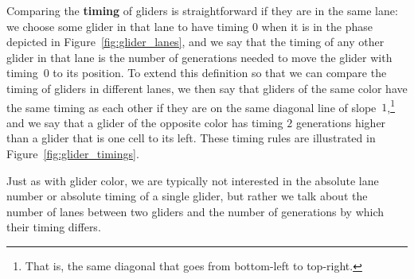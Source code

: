 Comparing the \textbf{timing} of gliders is straightforward if they are in the same lane: we choose some glider in that lane to have timing $0$ when it is in the phase depicted in Figure~\ref{fig:glider_lanes}, and we say that the timing of any other glider in that lane is the number of generations needed to move the glider with timing~$0$ to its position. To extend this definition so that we can compare the timing of gliders in different lanes, we then say that gliders of the same color have the same timing as each other if they are on the same diagonal line of slope~$1$,\footnote{That is, the same diagonal that goes from bottom-left to top-right.} and we say that a glider of the opposite color has timing $2$ generations higher than a glider that is one cell to its left. These timing rules are illustrated in Figure~\ref{fig:glider_timings}.

Just as with glider color, we are typically not interested in the absolute lane number or absolute timing of a single glider, but rather we talk about the number of lanes between two gliders and the number of generations by which their timing differs.

